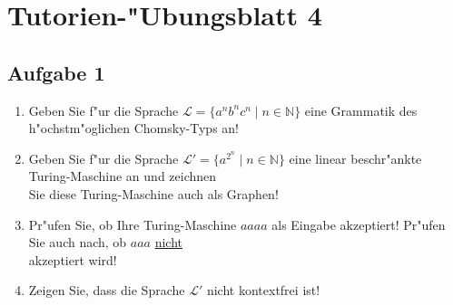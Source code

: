 \documentclass[10pt,oneside,onecolumn,a4paper,german,titlepage]{article}
\begin{document}
\section*{Tutorien-"Ubungsblatt 4}

\subsection*{Aufgabe 1}
\begin{enumerate}
\item Geben Sie f"ur die Sprache $\mathcal{L} = \{a^nb^nc^n \; | \; n \in
\mathbb{N}\}$ eine Grammatik des h"ochstm"oglichen Chomsky-Typs an!
\item Geben Sie f"ur die Sprache $\mathcal{L}' = \{a^{2^n} \; | \; n \in
\mathbb{N}\}$ eine linear beschr"ankte Turing-Maschine an und zeichnen\\
Sie diese Turing-Maschine auch als Graphen!
\item Pr"ufen Sie, ob Ihre Turing-Maschine $aaaa$ als Eingabe akzeptiert!
Pr"ufen Sie auch nach, ob $aaa$ \underline{nicht}\\
akzeptiert wird!
\item Zeigen Sie, dass die Sprache $\mathcal{L}'$ nicht kontextfrei ist!
\end{enumerate}
\end{document}
